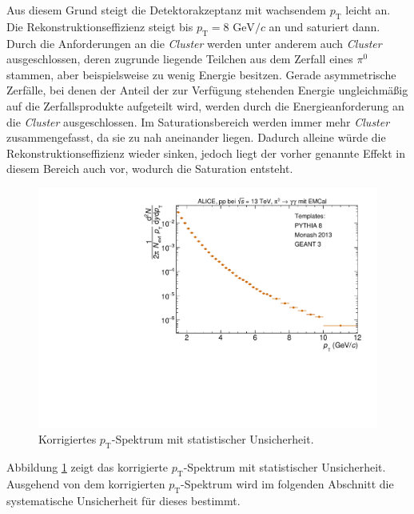 Aus diesem Grund steigt die Detektorakzeptanz mit wachsendem $p_\text{T}$ leicht an.
\newline
Die Rekonstruktionseffizienz steigt bis $p_\text{T} = 8 \text{ GeV}/c$ an und saturiert dann.
Durch die Anforderungen an die \textit{Cluster} werden unter anderem auch \textit{Cluster} ausgeschlossen, deren zugrunde liegende Teilchen aus dem Zerfall eines $\pi^{0}$ stammen, aber beispielsweise zu wenig Energie besitzen.
Gerade asymmetrische Zerfälle, bei denen der Anteil der zur Verfügung stehenden Energie ungleichmäßig auf die Zerfallsprodukte aufgeteilt wird, werden durch die Energieanforderung an die \textit{Cluster} ausgeschlossen.
Im Saturationsbereich werden immer mehr \textit{Cluster} zusammengefasst, da sie zu nah aneinander liegen.
Dadurch alleine würde die Rekonstruktionseffizienz wieder sinken, jedoch liegt der vorher genannte Effekt in diesem Bereich auch vor, wodurch die Saturation entsteht.
\begin{figure}[t!]
\centering
\includegraphics[width=.65\linewidth]{KorrigierterYieldNurStat_Data_2016.pdf}
\caption{Korrigiertes $p_\text{T}$-Spektrum mit statistischer Unsicherheit.
}
\label{fig:YieldStatUncer}
\end{figure}
\newline
Abbildung \ref{fig:YieldStatUncer} zeigt das korrigierte $p_\text{T}$-Spektrum mit statistischer Unsicherheit.
Ausgehend von dem korrigierten $p_\text{T}$-Spektrum wird im folgenden Abschnitt die systematische Unsicherheit für dieses bestimmt.